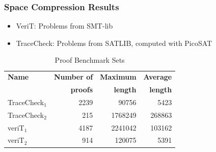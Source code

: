 \documentclass{beamer}
\begin{document}
\begin{frame}

\frametitle{Space Compression Results}

\begin{itemize}
	\item VeriT: Problems from SMT-lib
	\item TraceCheck: Problems from SATLIB, computed with PicoSAT
\end{itemize}

\begin{table}[tb]
	\centering
	\setlength{\tabcolsep}{8pt}
	\begin{tabular}{lrrr}
		\toprule
		\textbf{Name} & \textbf{Number of} & \textbf{Maximum} & \textbf{Average} \\ 
		              & \textbf{proofs}    & \textbf{length}  & \textbf{length} \\
		\midrule
		TraceCheck$_1$ & 2239 & 90756   & 5423   \\
		TraceCheck$_2$ & 215	& 1768249 & 268863 \\
    veriT$_1$ & 4187 & 2241042 & 103162 \\
    veriT$_2$ & 914  & 120075  & 5391  \\ 
		\bottomrule   
	\end{tabular}
	\caption{Proof Benchmark Sets}
	\label{tab:benchmarks}
\end{table}


\end{frame}
\end{document}
